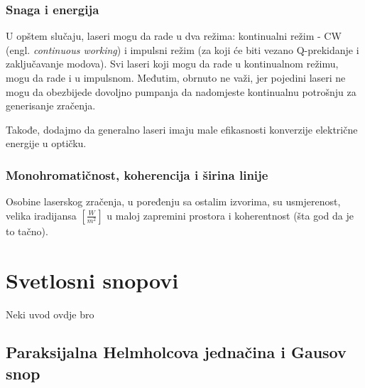 \documentclass[fleqn]{report}
\begin{document}
\subsection{Snaga i energija}

U opštem slučaju, laseri mogu da rade u dva režima: kontinualni režim - CW (engl. \emph{continuous working}) i impulsni režim (za koji će biti vezano Q-prekidanje i zaključavanje modova).
Svi laseri koji mogu da rade u kontinualnom režimu, mogu da rade i u impulsnom. Međutim, obrnuto ne važi, jer pojedini laseri ne mogu da obezbijede dovoljno pumpanja da nadomjeste kontinualnu potrošnju za generisanje zračenja.

Takođe, dodajmo da generalno laseri imaju male efikasnosti konverzije električne energije u optičku.

\subsection{Monohromatičnost, koherencija i širina linije}

Osobine laserskog zračenja, u poređenju sa ostalim izvorima, su usmjerenost, velika iradijansa $\left[\frac{W}{m^2}\right]$ u maloj zapremini prostora i koherentnost (šta god da je to tačno).


\chapter{Svetlosni snopovi}
Neki uvod ovdje bro

\section{Paraksijalna Helmholcova jednačina i Gausov snop}
\end{document}
